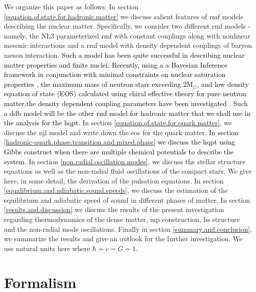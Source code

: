 \documentclass[a4paper, 11pt]{article}
\newcommand{\magenta}[1]{\textcolor{black}{#1}}
\begin{document}
We organize this paper as follows. In section \ref{equation.of.state.for.hadronic.matter} we discuss salient features of \ac{rmf} models describing the nuclear matter. Specifically, we consider two different \ac{rmf} models - namely, 
the NL3 parameterized \ac{rmf} with constant couplings along with nonlinear mesonic interactions and a \ac{rmf} model with
density dependent couplings of baryon meson interaction.
 \magenta{Such a model has been quite successful in describing nuclear matter properties and finite nuclei\cite{Typel:1991}. 
Recently, using a a Bayesian Inference framework in conjunction with minimal constraints on  nuclear saturation
properties , the maximum mass of neutron stars exceeding 2M$_\odot$, and low density equation of state (EOS) 
calculated using chiral effective theory for pure neutron matter,the density dependent coupling parameters have been 
investigated \cite{Malik:2022aas,Malik:2022jqc}.  Such a \ac{ddb} model will be the other \ac{rmf}
model for hadronic matter that we shall use in the analysis for the \ac{hqpt}.}
 In section \ref{equation.of.state.for.quark.matter}, we discuss the \ac{njl} model and write 
down the \ac{eos} for the quark matter. \magenta{In section \ref{hadronic-quark.phase.transition.and.mixed.phase} 
we discuss the \ac{hqpt} using Gibbs construct when there are multiple chemical potentials
to describe the system.} 
In section \ref{non.radial.oscillation.modes}, we discuss the stellar structure equations as well as the non-radial 
fluid oscillations of the compact stars. We give here, in some detail, the derivation of the pulsation equations. 
In section \ref{equalibrium.and.adiabatic.sound.speeds}, we discuss the estimation of the equilibrium and adiabatic
 speed of sound in different phases of matter. In section \ref{results.and.discussion} we discuss the results of the
 present investigation regarding thermodynamics of the dense matter, 
\ac{mp} construction, \ac{hs} structure and the non-radial mode oscillations.
 Finally in section \ref{summary.and.conclusion}, we summarize the results and give an outlook for the further investigation. We use natural units here where $\hbar=c=G=1$.

\section{Formalism}
\end{document}
